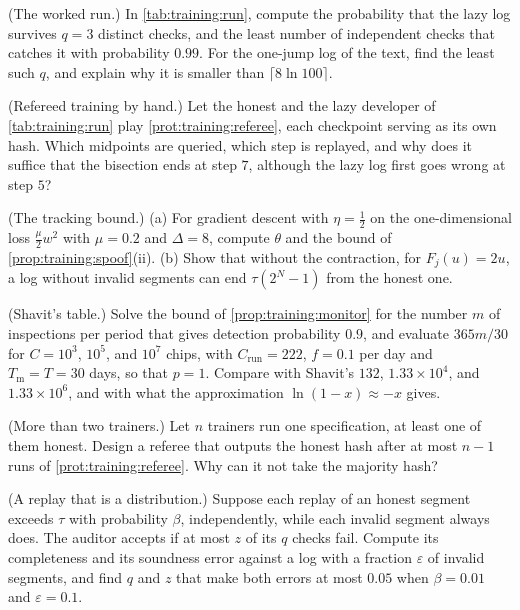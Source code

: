 \begin{refsection}
\begin{exercises}
\item \consolidation (The worked run.) In \cref{tab:training:run}, compute the probability that the lazy log survives $q=3$ distinct checks, and the least number of independent checks that catches it with probability $0.99$. For the one-jump log of the text, find the least such $q$, and explain why it is smaller than $\lceil8\ln100\rceil$.\label{ex:training:run}

\item \consolidation (Refereed training by hand.) Let the honest and the lazy developer of \cref{tab:training:run} play \cref{prot:training:referee}, each checkpoint serving as its own hash. Which midpoints are queried, which step is replayed, and why does it suffice that the bisection ends at step $7$, although the lazy log first goes wrong at step $5$?\label{ex:training:referee}

\item \consolidation (The tracking bound.) (a) For gradient descent with $\eta=\frac12$ on the one-dimensional loss $\frac{\mu}2w^2$ with $\mu=0.2$ and $\Delta=8$, compute $\theta$ and the bound of \cref{prop:training:spoof}(ii). (b) Show that without the contraction, for $F_j(u)=2u$, a log without invalid segments can end $\tau(2^N-1)$ from the honest one.\label{ex:training:tracking}

\item \consolidation (Shavit's table.) Solve the bound of \cref{prop:training:monitor} for the number $m$ of inspections per period that gives detection probability $0.9$, and evaluate $365m/30$ for $C=10^3$, $10^5$, and $10^7$ chips, with $C_{\mathrm{run}}=222$, $f=0.1$ per day and $T_{\mathrm m}=T=30$ days, so that $p=1$. Compare with Shavit's $132$, $1.33\times10^4$, and $1.33\times10^6$, and with what the approximation $\ln(1-x)\approx-x$ gives.\label{ex:training:shavit}

\item \variation (More than two trainers.) Let $n$ trainers run one specification, at least one of them honest. Design a referee that outputs the honest hash after at most $n-1$ runs of \cref{prot:training:referee}. Why can it not take the majority hash?\label{ex:training:many}

\item \variation (A replay that is a distribution.) Suppose each replay of an honest segment exceeds $\tau$ with probability $\beta$, independently, while each invalid segment always does. The auditor accepts if at most $z$ of its $q$ checks fail. Compute its completeness and its soundness error against a log with a fraction $\varepsilon$ of invalid segments, and find $q$ and $z$ that make both errors at most $0.05$ when $\beta=0.01$ and $\varepsilon=0.1$.\label{ex:training:noisy}


\end{exercises}
\end{refsection}
